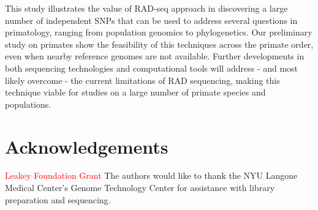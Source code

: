 \documentclass[12pt]{article}
\begin{document}
This study illustrates the value of RAD-seq approach in discovering a large number of independent SNPs that can be used to address several questions in primatology, ranging from population genomics to phylogenetics. Our preliminary study on primates show the feasibility of this techniques across the primate order, even when nearby reference genomes are not available. Further developments in both sequencing technologies and computational tools will address - and most likely overcome - the current limitations of RAD sequencing, making this technique viable for studies on a large number of primate species and populations.

\section{Acknowledgements}

\textcolor{red}{Leakey Foundation Grant} The authors would like to thank the NYU Langone Medical Center's Genome Technology Center for assistance with library preparation and sequencing.
\end{document}
